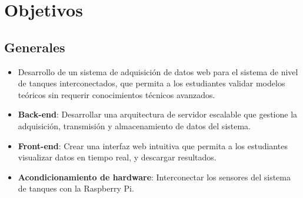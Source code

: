 \section{Objetivos}

\subsection{Generales}
    \begin{itemize}
        \item Desarrollo de un sistema de adquisición de datos web para el sistema de nivel de tanques interconectados, que permita a los estudiantes validar modelos teóricos sin requerir conocimientos técnicos avanzados.
        \item \textbf{Back-end}: Desarrollar una arquitectura de servidor escalable que gestione la adquisición, transmisión y almacenamiento de datos del sistema.
        \item \textbf{Front-end}: Crear una interfaz web intuitiva que permita a los estudiantes visualizar datos en tiempo real, y descargar resultados.
        \item \textbf{Acondicionamiento de hardware}: Interconectar los sensores del sistema de tanques con la Raspberry Pi.
    \end{itemize}

